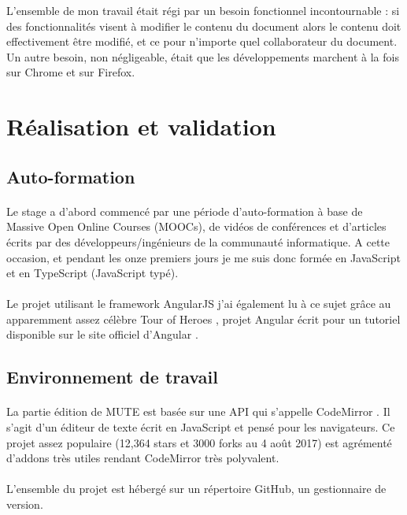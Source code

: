 \documentclass[12pt]{article}
\begin{document}
L'ensemble de mon travail était régi par un besoin fonctionnel incontournable : si des fonctionnalités visent à modifier le contenu du document alors le contenu doit effectivement être modifié, et ce pour n'importe quel collaborateur du document. Un autre besoin, non négligeable, était que les développements marchent à la fois sur Chrome et sur Firefox.

\newpage
\section{Réalisation et validation}
\subsection{Auto-formation}
\paragraph{}
Le stage a d'abord commencé par une période d'auto-formation à base de Massive Open Online Courses (MOOCs), de vidéos de conférences et d'articles écrits par des développeurs/ingénieurs de la communauté informatique. A cette occasion, et pendant les onze premiers jours je me suis donc formée en JavaScript et en TypeScript (JavaScript typé).
\paragraph{}
Le projet utilisant le framework AngularJS j'ai également lu à ce sujet grâce au apparemment assez célèbre Tour of Heroes \cite{tour}, projet Angular écrit pour un tutoriel disponible sur le site officiel d'Angular \cite{angular}.

\subsection{Environnement de travail}
\paragraph{}
La partie édition de MUTE est basée sur une API qui s'appelle CodeMirror \cite{codemirror}. Il s'agit d'un éditeur de texte écrit en JavaScript et pensé pour les navigateurs. Ce projet assez populaire (12,364 stars et 3000 forks au 4 août 2017) est agrémenté d'addons très utiles rendant CodeMirror très polyvalent.

\paragraph{}
L'ensemble du projet est hébergé sur un répertoire GitHub, un gestionnaire de version.
\end{document}
